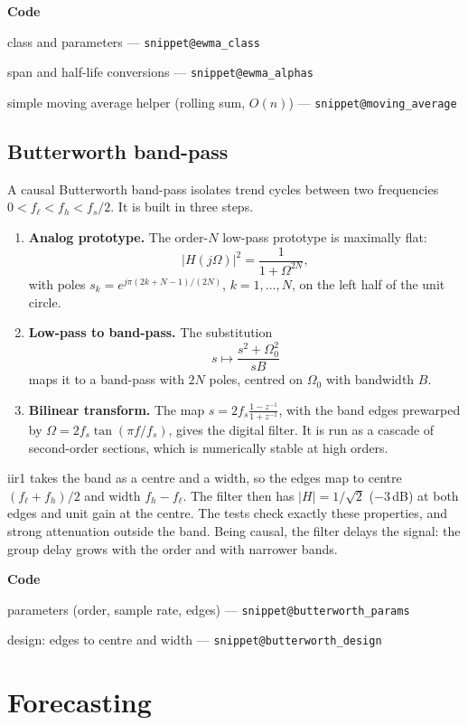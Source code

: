 \documentclass[11pt,a4paper]{article}
\makeatletter
\newcommand{\snippetsource}[1]{\csname snippet@#1\endcsname}
\newcommand{\snippet}[3]{%
  }
\newenvironment{codepointers}{%
  \par\smallskip\begingroup\footnotesize\noindent\textcolor{blue!50!black}{\textbf{Code}}\par\nopagebreak
  \begin{list}{}{\setlength{\leftmargin}{1.2em}\setlength{\itemsep}{0pt}\setlength{\parsep}{0pt}\setlength{\topsep}{1pt}}}%
  {\end{list}\endgroup\smallskip}
\newcommand{\codeitem}[2]{\item #2 --- \texttt{\snippetsource{#1}}}
\makeatother
\begin{document}
\snippet{ewma_impl}{C++}{EWMA on iir1's one-pole section, with first-sample seeding}
\begin{codepointers}
  \codeitem{ewma_class}{class and parameters}
  \codeitem{ewma_alphas}{span and half-life conversions}
  \codeitem{moving_average}{simple moving average helper (rolling sum, $O(n)$)}
\end{codepointers}

\subsection{Butterworth band-pass}
A causal Butterworth band-pass isolates trend cycles between two frequencies
$0<f_\ell<f_h<f_s/2$. It is built in three steps.
\begin{enumerate}
  \item \textbf{Analog prototype.} The order-$N$ low-pass prototype is maximally flat:
        \[
          |H(j\Omega)|^2=\frac{1}{1+\Omega^{2N}},
        \]
        with poles $s_k=e^{j\pi(2k+N-1)/(2N)}$, $k=1,\dots,N$, on the left half of the unit
        circle.
  \item \textbf{Low-pass to band-pass.} The substitution
        \[
          s\mapsto\frac{s^2+\Omega_0^2}{sB}
        \]
        maps it to a band-pass with $2N$ poles, centred on $\Omega_0$ with bandwidth $B$.
  \item \textbf{Bilinear transform.} The map $s=2f_s\frac{1-z^{-1}}{1+z^{-1}}$, with the band
        edges prewarped by $\Omega=2f_s\tan(\pi f/f_s)$, gives the digital filter. It is run
        as a cascade of second-order sections, which is numerically stable at high orders.
\end{enumerate}
iir1 takes the band as a centre and a width, so the edges map to centre
$(f_\ell+f_h)/2$ and width $f_h-f_\ell$. The filter then has $|H|=1/\sqrt2$ ($-3$\,dB)
at both edges and unit gain at the centre. The tests check exactly these properties, and
strong attenuation outside the band. Being causal, the filter delays the signal: the
group delay grows with the order and with narrower bands.
\begin{codepointers}
  \codeitem{butterworth_params}{parameters (order, sample rate, edges)}
  \codeitem{butterworth_design}{design: edges to centre and width}
\end{codepointers}

\section{Forecasting}\label{sec:forecast}
\end{document}
